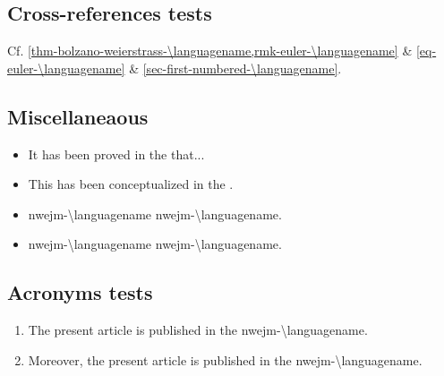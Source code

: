 \documentclass[french]{nwejmart}
\begin{document}
\subsection{Cross-references tests}
Cf. \vref{thm-bolzano-weierstrass-\languagename,rmk-euler-\languagename} \&
\vref{eq-euler-\languagename} \& \vref{sec-first-numbered-\languagename}.
%
\subsection{Miscellaneaous}
\begin{itemize}
\item It has been proved in the  
  that...
\item This has been conceptualized in the  .
\item \acrshort{nwejm-\languagename} \ie{} \acrlong*{nwejm-\languagename}.
\item \acrshort{nwejm-\languagename} \ie*{} \acrlong*{nwejm-\languagename}.
\end{itemize}
%
\subsection{Acronyms tests}
\begin{enumerate}
\item The present article is published in the \gls{nwejm-\languagename}.
\item Moreover, the present article is published in the \gls{nwejm-\languagename}.
\end{enumerate}
%
\end{document}
